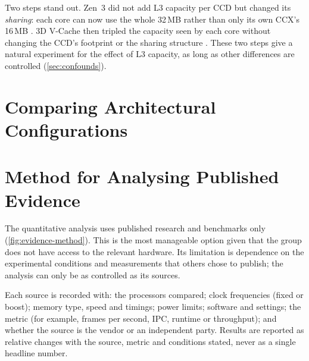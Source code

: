 Two steps stand out. Zen~3 did not add L3 capacity per CCD but changed its \emph{sharing}: each core can now use the whole 32\,MB rather than only its own CCX's 16\,MB \cite{amd2022epyc7003,suggs2019zen2}. 3D V-Cache then tripled the capacity seen by each core without changing the CCD's footprint or the sharing structure \cite{amd2022epyc7003,wuu2022vcache}. These two steps give a natural experiment for the effect of L3 capacity, as long as other differences are controlled (\cref{sec:confounds}).


\section{Comparing Architectural Configurations}
\label{sec:config-compare}

\section{Method for Analysing Published Evidence}
\label{sec:evidence-method}

The quantitative analysis uses published research and benchmarks only (\cref{fig:evidence-method}). This is the most manageable option given that the group does not have access to the relevant hardware. Its limitation is dependence on the experimental conditions and measurements that others chose to publish; the analysis can only be as controlled as its sources.



Each source is recorded with: the processors compared; clock frequencies (fixed or boost); memory type, speed and timings; power limits; software and settings; the metric (for example, frames per second, IPC, runtime or throughput); and whether the source is the vendor or an independent party. Results are reported as relative changes with the source, metric and conditions stated, never as a single headline number.

